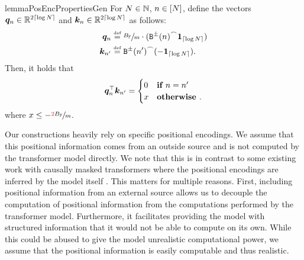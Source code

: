\begin{restatable}{lemma}{PosEncPropertiesGen} \label{lem:our-pos-enc-properties}
   For ${{N}} \in {{\mathbb{N}}}$, ${{n}} \in {\left[ {{N}}\right]}$, define the vectors ${{{\bm{q}}}}_{{n}} \in {{\mathbb{R}}}^{2 \lceil\log{{N}}\rceil}$ and ${{{\bm{k}}}}_{{n}} \in {{\mathbb{R}}}^{2 \lceil\log{{N}}\rceil}$ as follows:
   \begin{subequations}
      \begin{align}
         \vq_\stridx &\defeq \sfrac{\maxFNum}{m} \cdot (\interleaveFun{\sbinFun{\stridx}}{\one_{\ceil{\log\strlen}}}) \\
         \vk_{\stridx'} &\defeq \interleaveFun{\sbinFun{\stridx'}}{(-\one_{\ceil{\log\strlen}})}.
      \end{align}
   \end{subequations}
   Then, it holds that
   \begin{equation}
      {{{{{\bm{q}}}}_{{n}}^\top {{{\bm{k}}}}_{{{n}}'}}} =
      \begin{cases}
         0 & \textbf{if } {{n}} = {{n}}' \\
         x & \textbf{otherwise }.
      \end{cases}
   \end{equation}
   where $x \leq -\sfrac{\textcolor{ETHRed}{2}\maxFNum}{m}$.
\end{restatable}

Our constructions heavily rely on specific positional encodings.
We assume that this positional information comes from an outside source and is not computed by the transformer model directly. 
We note that this is in contrast to some existing work with causally masked transformers where the positional encodings are inferred by the model itself \citep{yang2024masked,li2025characterizingexpressivitytransformerlanguage,jerad2025uniquehardattentiontale}.
This matters for multiple reasons.
First, including positional information from an external source allows us to decouple the computation of positional information from the computations performed by the transformer model.
Furthermore, it facilitates providing the model with structured information that it would not be able to compute on its own.
While this could be abused to give the model unrealistic computational power, we assume that the positional information is easily computable and thus realistic.

